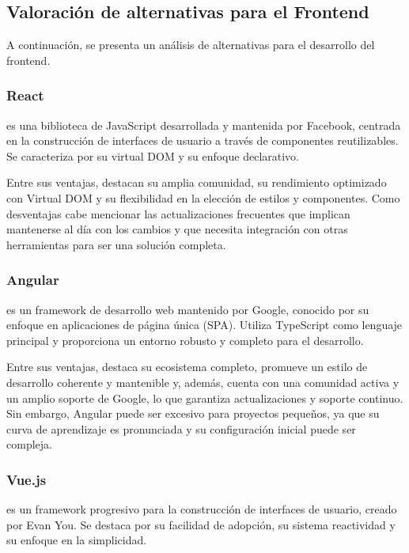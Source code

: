 \subsection{Valoración de alternativas para el Frontend}
A continuación, se presenta un análisis de alternativas para el desarrollo del frontend.

\subsubsection{React}
 es una biblioteca de JavaScript desarrollada y mantenida por Facebook, centrada en la construcción de interfaces de usuario a través de componentes reutilizables. Se caracteriza por su virtual DOM y su enfoque declarativo.

Entre sus ventajas, destacan su amplia comunidad, su rendimiento optimizado con Virtual DOM y su flexibilidad en la elección de estilos y componentes. 
Como desventajas cabe mencionar las actualizaciones frecuentes que implican mantenerse al día con los cambios y que necesita integración con otras herramientas para ser una solución completa.


\subsubsection{Angular}
 es un framework de desarrollo web mantenido por Google, conocido por su enfoque en aplicaciones de página única (SPA). Utiliza TypeScript como lenguaje principal y proporciona un entorno robusto y completo para el desarrollo.

Entre sus ventajas, destaca su ecosistema completo, promueve un estilo de desarrollo coherente y mantenible y, además, cuenta con una comunidad activa y un amplio soporte de Google, lo que garantiza actualizaciones y soporte continuo.
Sin embargo, Angular puede ser excesivo para proyectos pequeños, ya que su curva de aprendizaje es pronunciada y su configuración inicial puede ser compleja.

\subsubsection{Vue.js}
 es un framework progresivo para la construcción de interfaces de usuario, creado por Evan You. Se destaca por su facilidad de adopción, su sistema reactividad y su enfoque en la simplicidad.

